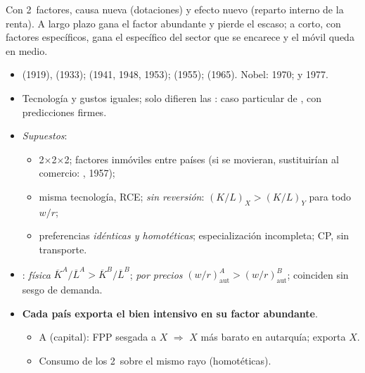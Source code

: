 \documentclass{article}
\begin{document}
\begin{columnas}
\begin{ideaclave}
Con 2~factores, causa nueva (dotaciones) y efecto nuevo (reparto interno de la renta). A largo plazo gana el factor abundante y pierde el escaso; a corto, con factores específicos, gana el específico del sector que se encarece y el móvil queda en medio.
\end{ideaclave}

\begin{itemize}
\item {} (1919),  (1933);  (1941, 1948, 1953);  (1955);  (1965). Nobel:  1970;  y  1977.
\item Tecnología y gustos iguales; solo difieren las : caso particular de , con predicciones firmes.
\item \emph{Supuestos}:
  \begin{itemize}
  \item 2×2×2; factores inmóviles entre países (si se movieran, sustituirían al comercio: , 1957);
  \item misma tecnología, RCE; \emph{sin reversión}: $(K/L)_X>(K/L)_Y$ para todo $w/r$;
  \item preferencias \emph{idénticas y homotéticas}; especialización incompleta; CP, sin transporte.
  \end{itemize}
\item {}: \emph{física} $\overline K^A/\overline L^A>\overline K^B/\overline L^B$; \emph{por precios} $(w/r)^A_{\mathrm{aut}}>(w/r)^B_{\mathrm{aut}}$; coinciden sin sesgo de demanda.
\end{itemize}
\begin{itemize}
\item \textbf{Cada país exporta el bien intensivo en su factor abundante}.
  \begin{itemize}
  \item A (capital): FPP sesgada a $X$ $\Rightarrow$ $X$ más barato en autarquía; exporta $X$.
  \item Consumo de los 2~sobre el mismo rayo (homotéticas).
  \end{itemize}
\end{itemize}

\end{columnas}
\end{document}
